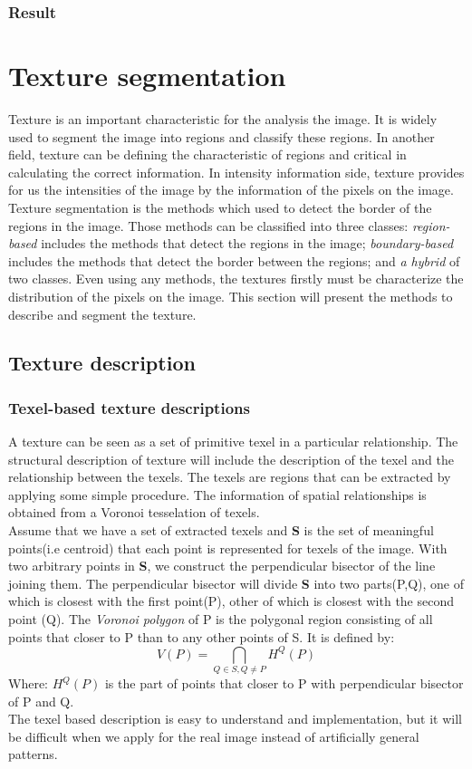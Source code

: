  \subsubsection{Result}
 
\section{Texture segmentation}
Texture is an important characteristic for the analysis the image. It is widely used to segment the image into regions and classify these regions. In another field, texture can be defining the characteristic of regions and critical in calculating the correct information. In intensity information side, texture provides for us the intensities of the image by the information of the pixels on the image. Texture segmentation is the methods which used to detect the border of the regions in the image. Those methods can be classified into three classes: \textit{region-based} includes the methods that detect the regions in the image; \textit{boundary-based} includes the methods that detect the border between the regions; and \textit{a hybrid} of two classes. Even using any methods, the textures firstly must be characterize the distribution of the pixels on the image. This section will present the methods to describe and segment the texture.
\subsection{Texture description}
\subsubsection{Texel-based texture descriptions}
A texture can be seen as a set of primitive texel in a particular relationship. The structural description of texture will include the description of the texel and the relationship between the texels. The texels are regions that can be extracted by applying some simple procedure. The information of spatial relationships is obtained from a Voronoi tesselation of texels.\\[0.2cm]
Assume that we have a set of extracted texels and \textbf{S} is the set of meaningful points(i.e centroid) that each point is represented for texels of the image. With two arbitrary points in \textbf{S}, we construct the perpendicular bisector of the line joining them. The perpendicular bisector will divide \textbf{S} into two parts(P,Q), one of which is closest with the first point(P), other of which is closest with the second point (Q). The \textit{Voronoi polygon} of P is the polygonal region consisting of all points that closer to P than to any other points of S. It is defined by:
\begin{equation}
	V(P) = \bigcap_{Q \in S, Q \neq P} H^Q(P)
\end{equation}
Where: $H^Q(P)$ is the part of points that closer to P with perpendicular bisector of P and Q.\\
The texel based description is easy to understand and implementation, but it will be difficult when we apply for the real image instead of artificially general patterns.
